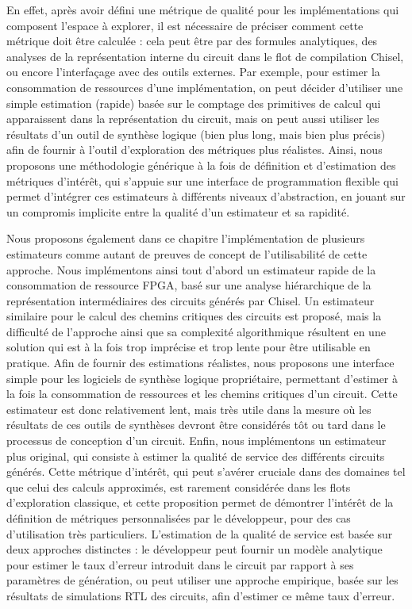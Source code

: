     En effet, après avoir défini une métrique de qualité pour les implémentations qui composent l'espace à explorer, il est nécessaire de préciser comment cette métrique doit être calculée : cela peut être par des formules analytiques, des analyses de la représentation interne du circuit dans le flot de compilation Chisel, ou encore l'interfaçage avec des outils externes.
    Par exemple, pour estimer la consommation de ressources d'une implémentation, on peut décider d'utiliser une simple estimation (rapide) basée sur le comptage des primitives de calcul qui apparaissent dans la représentation du circuit, mais on peut aussi utiliser les résultats d'un outil de synthèse logique (bien plus long, mais bien plus précis) afin de fournir à l'outil d'exploration des métriques plus réalistes.
    Ainsi, nous proposons une méthodologie générique à la fois de définition et d'estimation des métriques d'intérêt, qui s'appuie sur une interface de programmation flexible qui permet d'intégrer ces estimateurs à différents niveaux d'abstraction, en jouant sur un compromis implicite entre la qualité d'un estimateur et sa rapidité.

    Nous proposons également dans ce chapitre l'implémentation de plusieurs estimateurs comme autant de preuves de concept de l'utilisabilité de cette approche.
    Nous implémentons ainsi tout d'abord un estimateur rapide de la consommation de ressource FPGA, basé sur une analyse hiérarchique de la représentation intermédiaires des circuits générés par Chisel.
    Un estimateur similaire pour le calcul des chemins critiques des circuits est proposé, mais la difficulté de l'approche ainsi que sa complexité algorithmique résultent en une solution qui est à la fois trop imprécise et trop lente pour être utilisable en pratique.
    Afin de fournir des estimations réalistes, nous proposons une interface simple pour les logiciels de synthèse logique propriétaire, permettant d'estimer à la fois la consommation de ressources et les chemins critiques d'un circuit.
    Cette estimateur est donc relativement lent, mais très utile dans la mesure où les résultats de ces outils de synthèses devront être considérés tôt ou tard dans le processus de conception d'un circuit.
    Enfin, nous implémentons un estimateur plus original, qui consiste à estimer la qualité de service des différents circuits générés.
    Cette métrique d'intérêt, qui peut s'avérer cruciale dans des domaines tel que celui des calculs approximés, est rarement considérée dans les flots d'exploration classique, et cette proposition permet de démontrer l'intérêt de la définition de métriques personnalisées par le développeur, pour des cas d'utilisation très particuliers.
    L'estimation de la qualité de service est basée sur deux approches distinctes : le développeur peut fournir un modèle analytique pour estimer le taux d'erreur introduit dans le circuit par rapport à ses paramètres de génération, ou peut utiliser une approche empirique, basée sur les résultats de simulations RTL des circuits, afin d'estimer ce même taux d'erreur.

